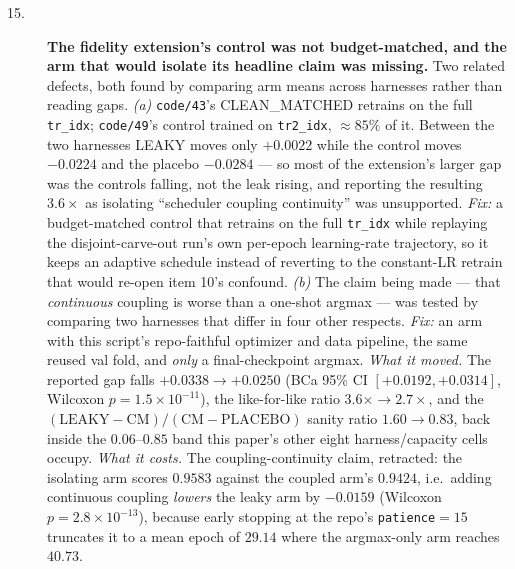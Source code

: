 \documentclass[10pt]{article} %
\begin{document}
\begin{description}
\item[15.] \textbf{The fidelity extension's control was not budget-matched,
  and the arm that would isolate its headline claim was missing.} Two related
  defects, both found by comparing arm means across harnesses rather than
  reading gaps. \emph{(a)} \texttt{code/43}'s CLEAN\_MATCHED retrains on the
  full \texttt{tr\_idx}; \texttt{code/49}'s control trained on
  \texttt{tr2\_idx}, $\approx$$85\%$ of it. Between the two harnesses LEAKY
  moves only $+0.0022$ while the control moves $-0.0224$ and the placebo
  $-0.0284$ --- so most of the extension's larger gap was the controls falling,
  not the leak rising, and reporting the resulting $3.6\times$ as isolating
  ``scheduler coupling continuity'' was unsupported. \textit{Fix:} a
  budget-matched control that retrains on the full \texttt{tr\_idx} while
  replaying the disjoint-carve-out run's own per-epoch learning-rate
  trajectory, so it keeps an adaptive schedule instead of reverting to the
  constant-LR retrain that would re-open item 10's confound. \emph{(b)} The
  claim being made --- that \emph{continuous} coupling is worse than a one-shot
  argmax --- was tested by comparing two harnesses that differ in four other
  respects. \textit{Fix:} an arm with this script's repo-faithful optimizer and
  data pipeline, the same reused val fold, and \emph{only} a final-checkpoint
  argmax.
  \textit{What it moved.} The reported gap falls $+0.0338\to\mathbf{+0.0250}$
  (BCa 95\% CI $[+0.0192,+0.0314]$, Wilcoxon $p=1.5\times10^{-11}$), the
  like-for-like ratio $3.6\times\to2.7\times$, and the
  $(\text{LEAKY}-\text{CM})/(\text{CM}-\text{PLACEBO})$ sanity ratio
  $1.60\to0.83$, back inside the $0.06$--$0.85$ band this paper's other eight
  harness/capacity cells occupy. \textit{What it costs.} The
  coupling-continuity claim, retracted: the isolating arm scores $0.9583$
  against the coupled arm's $0.9424$, i.e.\ adding continuous coupling
  \emph{lowers} the leaky arm by $-0.0159$ (Wilcoxon $p=2.8\times10^{-13}$),
  because early stopping at the repo's \texttt{patience}$=15$ truncates it to a
  mean epoch of $29.14$ where the argmax-only arm reaches $40.73$.


\end{description}
\end{document}
